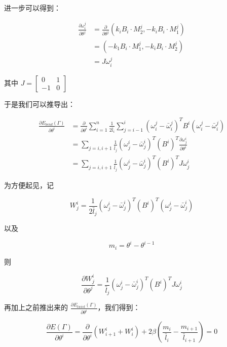 \documentclass{notes}
\begin{document}
进一步可以得到：

\begin{equation}
	\begin{aligned}
		\frac{\partial \omega_i^j}{\partial \theta^j} &= \frac{\partial }{\partial \theta^j} (k_iB_i \cdot M_2^j, -k_i B_i \cdot M_1^j) \\
		&= (-k_1B_i \cdot M_1^j, -k_iB_i \cdot M_2^j) \\
		&= J \omega_i^j
	\end{aligned}
\end{equation}

其中 $J = \begin{bmatrix}0 & 1 \\ -1 & 0\end{bmatrix}$

于是我们可以推导出：

\begin{equation}
	\begin{aligned}
		\frac{\partial E_{bend}(\Gamma)}{\partial \theta^i} &= \frac{\partial }{\partial \theta^i} \sum\limits_{i = 1}^{n} \frac{1}{2 \bar{l}_i} \sum\limits_{j = i - 1}^{i} (\omega_i^j - \bar{\omega}_i^j)^T B^i (\omega_i^j - \bar{\omega}_i^j) \\
		&= \sum\limits_{j = i, i + 1}\frac{1}{\bar{l}_{j}}(\omega_j^i - \bar{\omega}_j^i)^T(B^i)^T \frac{\partial \omega_j^i}{\partial \theta^i} \\
		&= \sum\limits_{j = i, i + 1} \frac{1}{\bar{l}_{j}}(\omega_j^i - \bar{\omega}_j^i)^T(B^i)^T J\omega_j^i
	\end{aligned}
\end{equation}

\begin{notation}
	为方便起见，记

	$$W^i_j = \frac{1}{2 \bar{l}_{j}}(\omega_j^i - \bar{\omega}_j^i)^T(B^i)^T (\omega_j^i - \bar{\omega}_j^i)$$

	以及

	$$m_i = \theta^{i} - \theta^{i - 1}$$

	则

	$$\frac{\partial W^i_j}{\partial \theta^j} = \frac{1}{\bar{l}_{j}}(\omega_j^i - \bar{\omega}_j^i)^T(B^i)^T J\omega_j^i$$
\end{notation}

再加上之前推出来的 $\frac{\partial E_{twist}(\Gamma)}{\partial \theta^i}$，我们得到：

\begin{equation}
	\frac{\partial E(\Gamma)}{\partial \theta^i} = \frac{\partial }{\partial \theta^i}(W_{i + 1}^i + W_{i}^i) + 2 \beta \left(\frac{m_i}{\bar{l}_i} - \frac{m_{i + 1}}{\bar{l}_{i + 1}}  \right) = 0
\end{equation}
\end{document}
